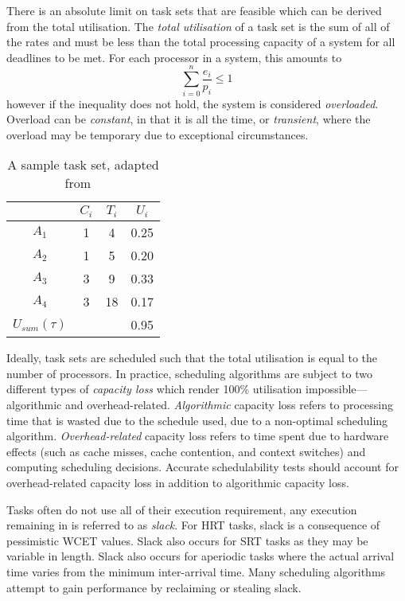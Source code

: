 There is an absolute limit on task sets that are feasible which can be derived from the total
utilisation. 
The \emph{total utilisation} of a task set is the sum of all of the rates and must be less than the
total processing capacity of a system for all deadlines to be met.
For each processor in a system, this amounts to
\begin{equation*}
	\sum\limits_{i=0}^n \dfrac{e_{i}}{p_{i}} \leq 1
\end{equation*}
however if the inequality does not hold, the system is considered \emph{overloaded}. Overload
can be \emph{constant}, in that it is all the time, or \emph{transient}, where the overload may be
temporary due to exceptional circumstances.

\begin{table}
    \centering
    \begin{tabular}{cccc} \toprule
        & \emph{$C_{i}$} & $T_{i}$ & $U_{i} $ \\ \midrule
			$ A_{1}$ & 1 & 4 & 0.25 \\
			$ A_{2}$ & 1 & 5 & 0.20 \\
			$ A_{3}$ & 3 & 9 & 0.33 \\
			$ A_{4}$ & 3 & 18 & 0.17  \\\midrule 
	$ U_{sum}(\tau)$ & &  & 0.95 \\ \bottomrule
	\end{tabular}
	\caption{A sample task set, adapted from ~\citep{Brandenburg:phd}}
	\label{tab:example_task_set}
\end{table}

Ideally, task sets are scheduled such that the total utilisation is equal to the number of
processors.  In practice, scheduling algorithms are subject to two different types of \emph{capacity
loss} which render 100\% utilisation impossible---algorithmic and overhead-related.
\emph{Algorithmic} capacity loss refers to processing time that is wasted due to the schedule used,
due to a non-optimal scheduling algorithm.  \emph{Overhead-related} capacity loss refers to time
spent due to hardware effects (such as cache misses, cache contention, and context switches) and
computing scheduling decisions.  Accurate schedulability tests should account for overhead-related
capacity loss in addition to algorithmic capacity loss.

Tasks often do not use all of their execution requirement, any execution remaining in is referred to
as \emph{slack}. For \gls{HRT} tasks, slack is a consequence of pessimistic \gls{WCET} values. Slack
also occurs for \gls{SRT} tasks as they may be variable in length. Slack also occurs for aperiodic
tasks where the actual arrival time varies from the minimum inter-arrival time. Many scheduling algorithms
attempt to gain performance by reclaiming or stealing slack.

